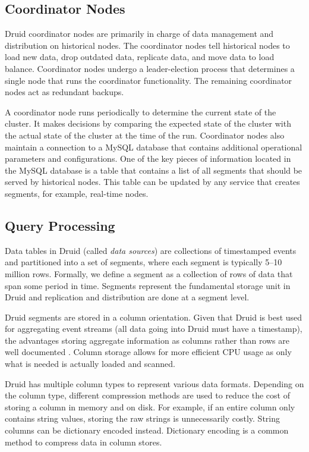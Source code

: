 \documentclass{vldb}
\begin{document}
\subsection{Coordinator Nodes}
Druid coordinator nodes are primarily in charge of data management and
distribution on historical nodes. The coordinator nodes tell historical nodes
to load new data, drop outdated data, replicate data, and move data to load
balance. Coordinator nodes undergo a
leader-election process that determines a single node that runs the coordinator
functionality. The remaining coordinator nodes act as redundant backups.

A coordinator node runs periodically to determine the current state of the
cluster. It makes decisions by comparing the expected state of the cluster with
the actual state of the cluster at the time of the run.  Coordinator nodes also
maintain a connection to a MySQL database that contains additional operational
parameters and configurations.  One of the key pieces of information located in
the MySQL database is a table that contains a list of all segments that should
be served by historical nodes.  This table can be updated by any service that
creates segments, for example, real-time nodes. 

\subsection{Query Processing}
Data tables in Druid (called \emph{data sources}) are collections of
timestamped events and partitioned into a set of segments, where each segment
is typically 5--10 million rows. Formally, we define a segment as a collection
of rows of data that span some period in time. Segments represent the
fundamental storage unit in Druid and replication and distribution are done at
a segment level.

Druid segments are stored in a column orientation. Given that Druid is best
used for aggregating event streams (all data going into Druid must have a
timestamp), the advantages storing aggregate information as columns rather than
rows are well documented \cite{abadi2008column}. Column storage allows for more
efficient CPU usage as only what is needed is actually loaded and scanned. 

Druid has multiple column types to represent various data formats. Depending on
the column type, different compression methods are used to reduce the cost of
storing a column in memory and on disk. For example, if an entire column only
contains string values, storing the raw strings is unnecessarily costly.
String columns can be dictionary encoded instead. Dictionary encoding is a
common method to compress data in column stores.
\end{document}
